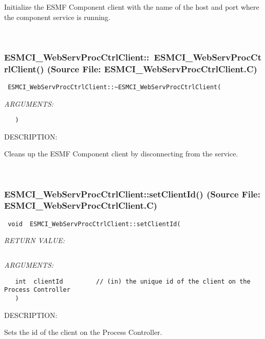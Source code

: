       Initialize the ESMF Component client with the name of the host and port
      where the component service is running.
   
 
\mbox{}\hrulefill\
 
\subsubsection{ESMCI\_WebServProcCtrlClient::~ESMCI\_WebServProcCtrlClient() (Source File: ESMCI\_WebServProcCtrlClient.C)}


  
\begin{verbatim} ESMCI_WebServProcCtrlClient::~ESMCI_WebServProcCtrlClient(\end{verbatim}{\em ARGUMENTS:}
\begin{verbatim}   )\end{verbatim}
{\sf DESCRIPTION:\\ }


      Cleans up the ESMF Component client by disconnecting from the service.
   
 
\mbox{}\hrulefill\
 
\subsubsection{ESMCI\_WebServProcCtrlClient::setClientId() (Source File: ESMCI\_WebServProcCtrlClient.C)}


  
\begin{verbatim} void  ESMCI_WebServProcCtrlClient::setClientId(\end{verbatim}{\em RETURN VALUE:}
\begin{verbatim} \end{verbatim}{\em ARGUMENTS:}
\begin{verbatim}   int  clientId         // (in) the unique id of the client on the Process Controller
   )\end{verbatim}
{\sf DESCRIPTION:\\ }


      Sets the id of the client on the Process Controller.
   
 
